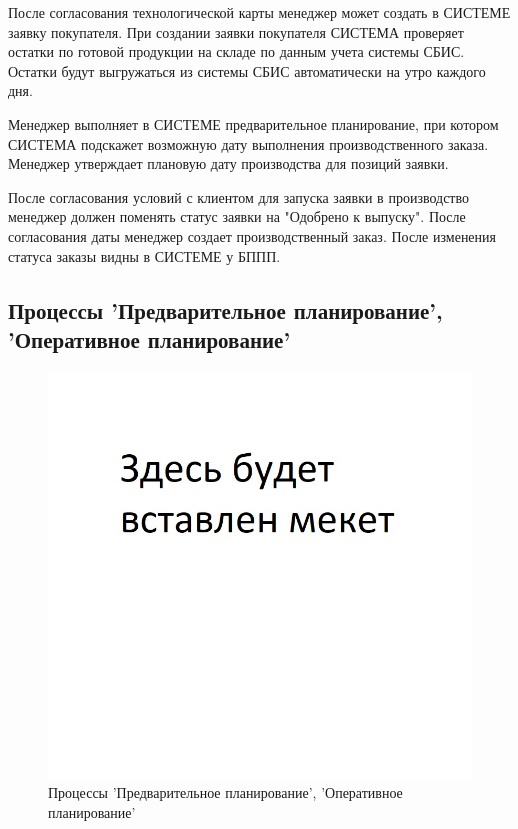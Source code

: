 После согласования технологической карты менеджер может создать в СИСТЕМЕ заявку покупателя. При создании заявки покупателя СИСТЕМА проверяет остатки по готовой продукции на складе по данным учета системы СБИС. Остатки будут выгружаться из системы СБИС автоматически на утро каждого дня.



Менеджер выполняет в СИСТЕМЕ предварительное планирование, при котором СИСТЕМА подскажет возможную дату выполнения производственного заказа. 
Менеджер  утверждает плановую дату производства для позиций заявки.

После согласования условий с клиентом для запуска заявки в производство менеджер должен поменять статус заявки на "Одобрено к выпуску". После согласования даты менеджер создает производственный заказ. После изменения статуса заказы видны в СИСТЕМЕ у БППП. 
   
\subsection{Процессы 'Предварительное планирование', 'Оперативное планирование'}
%
\begin{figure}
\begin{center}
  \includegraphics[angle=90, height=0.8\textheight, keepaspectratio]{Pics/Pattern.jpg}
\end{center}
  \caption{Процессы 'Предварительное планирование', 'Оперативное планирование'}
  \label{pic:Schema_3}
\end{figure}
\clearpage


